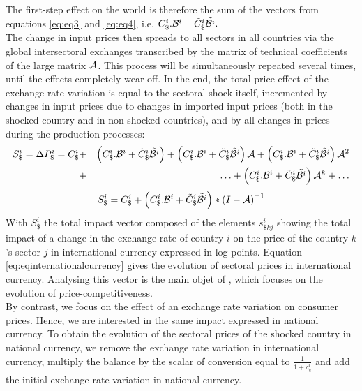 \documentclass[11pt,a4paper]{paper} %
\begin{document}
The first-step effect on the world is therefore the sum of the vectors from equations \ref{eq:eq3} and \ref{eq:eq4}, i.e. $C_\$^i.{\cal B}^i+{\tilde{C}_\$^i}{\tilde{{\cal B}^i}}.~$\\
The change in input prices then spreads to all sectors in all countries via the global intersectoral exchanges transcribed by the matrix of technical coefficients of the large matrix $\cal {A}$. This process will be simultaneously repeated several times, until the effects completely wear off.
In the end, the total price effect of the exchange rate variation is equal to the sectoral shock itself, incremented by changes in input prices due to changes in imported input prices (both in the shocked country and in non-shocked countries), and by all changes in prices during the production processes:\\
\begin{eqnarray*}
S_\$^i = \Delta{{P}_{\$}^i}=C_\$^i&+& \left(C_\$^i.{\cal B}^i+{\tilde{C}_\$^i}{\tilde{{\cal B}^ i}}\right)+ \left(C_\$^i.{\cal B}^i+{\tilde{C}_\$^i}{\tilde{{\cal B}^i}}\right){{\cal A}}+\left(C_\$^i.{\cal B}^i+{\tilde{C}_\$^i}{\tilde{{\cal B}^i}}\right){{\cal A}^{2}} \\
&+&\ldots+\left(C_\$^i.{\cal B}^i+{\tilde{C}_\$^i}{\tilde{{\cal B}^i}}\right){\cal A}^k +\ldots \\
\end{eqnarray*}
 \begin{eqnarray}
S_\$^i=C_\$^i+\left(C_\$^i.{\cal B}^i+{\tilde{C}_\$^i}{\tilde{{\cal B}^i}}\right)*{{(I-{\cal A})}^{-1}}	
\label{eq:eqinternationalcurrency}
 \end{eqnarray}
With $S_\$^i$ the total impact vector composed of the elements ${{{s}}^i_{\$kj}}$ showing the total impact of a change in the exchange rate of country $i$ on the price of the country $k$'s sector $j$ in international currency expressed in log points. 
Equation \ref{eq:eqinternationalcurrency} gives the evolution of sectoral prices in international currency. Analysing this vector is the main objet of \cite{Cochard2016}, which focuses on the evolution of price-competitiveness.\\
By contrast, we focus on the effect of an exchange rate variation on consumer prices. Hence, we are interested in the same impact expressed in national currency. To obtain the evolution of the sectoral prices of the shocked country in national currency, we remove the exchange rate variation in international currency, multiply the balance by the scalar of conversion equal to $\frac{1}{1+c_\$^i}$ and add the initial exchange rate variation in national currency.
\end{document}
